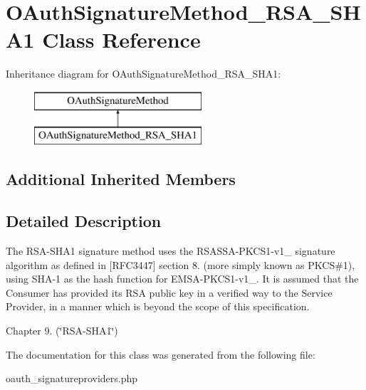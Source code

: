 \hypertarget{class_o_auth_signature_method___r_s_a___s_h_a1}{\section{O\-Auth\-Signature\-Method\-\_\-\-R\-S\-A\-\_\-\-S\-H\-A1 Class Reference}
\label{class_o_auth_signature_method___r_s_a___s_h_a1}
}
Inheritance diagram for O\-Auth\-Signature\-Method\-\_\-\-R\-S\-A\-\_\-\-S\-H\-A1\-:\begin{figure}[H]
\begin{center}
\leavevmode
\includegraphics[height=2.000000cm]{class_o_auth_signature_method___r_s_a___s_h_a1}
\end{center}
\end{figure}
\subsection*{Additional Inherited Members}


\subsection{Detailed Description}
The R\-S\-A-\/\-S\-H\-A1 signature method uses the R\-S\-A\-S\-S\-A-\/\-P\-K\-C\-S1-\/v1\-\_ signature algorithm as defined in \mbox{[}R\-F\-C3447\mbox{]} section 8. (more simply known as P\-K\-C\-S\#1), using S\-H\-A-\/1 as the hash function for E\-M\-S\-A-\/\-P\-K\-C\-S1-\/v1\-\_. It is assumed that the Consumer has provided its R\-S\-A public key in a verified way to the Service Provider, in a manner which is beyond the scope of this specification.
\begin{DoxyItemize}
\item Chapter 9. (\char`\"{}\-R\-S\-A-\/\-S\-H\-A1\char`\"{}) 
\end{DoxyItemize}

The documentation for this class was generated from the following file\-:\begin{DoxyCompactItemize}
\item 
oauth\-\_\-signatureproviders.\-php\end{DoxyCompactItemize}
